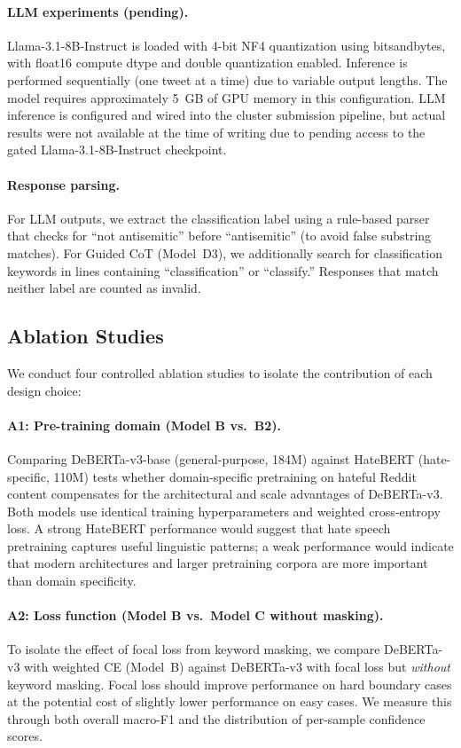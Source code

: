 \paragraph{LLM experiments (pending).}
Llama-3.1-8B-Instruct is loaded with 4-bit NF4 quantization using bitsandbytes, with float16 compute dtype and double quantization enabled. Inference is performed sequentially (one tweet at a time) due to variable output lengths. The model requires approximately 5~GB of GPU memory in this configuration. LLM inference is configured and wired into the cluster submission pipeline, but actual results were not available at the time of writing due to pending access to the gated Llama-3.1-8B-Instruct checkpoint.

\paragraph{Response parsing.}
For LLM outputs, we extract the classification label using a rule-based parser that checks for ``not antisemitic'' before ``antisemitic'' (to avoid false substring matches). For Guided CoT (Model~D3), we additionally search for classification keywords in lines containing ``classification'' or ``classify.'' Responses that match neither label are counted as invalid.

\subsection{Ablation Studies}
\label{sec:ablations}

We conduct four controlled ablation studies to isolate the contribution of each design choice:

\paragraph{A1: Pre-training domain (Model B vs.\ B2).}
Comparing DeBERTa-v3-base (general-purpose, 184M) against HateBERT (hate-specific, 110M) tests whether domain-specific pretraining on hateful Reddit content compensates for the architectural and scale advantages of DeBERTa-v3. Both models use identical training hyperparameters and weighted cross-entropy loss. A strong HateBERT performance would suggest that hate speech pretraining captures useful linguistic patterns; a weak performance would indicate that modern architectures and larger pretraining corpora are more important than domain specificity.

\paragraph{A2: Loss function (Model B vs.\ Model C without masking).}
To isolate the effect of focal loss from keyword masking, we compare DeBERTa-v3 with weighted CE (Model~B) against DeBERTa-v3 with focal loss but \emph{without} keyword masking. Focal loss should improve performance on hard boundary cases at the potential cost of slightly lower performance on easy cases. We measure this through both overall macro-F1 and the distribution of per-sample confidence scores.

